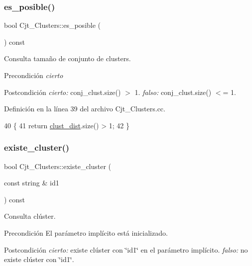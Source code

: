 \subsubsection{\texorpdfstring{es\+\_\+posible()}{es\_posible()}}
{\footnotesize\ttfamily bool Cjt\+\_\+\+Clusters\+::es\+\_\+posible (\begin{DoxyParamCaption}{ }\end{DoxyParamCaption}) const}



Consulta tamaño de conjunto de clusters. 

\begin{DoxyPrecond}{Precondición}
{\itshape cierto} 
\end{DoxyPrecond}
\begin{DoxyPostcond}{Postcondición}
{\itshape cierto\+:} conj\+\_\+clust.\+size() $>$ 1. {\itshape falso\+:} conj\+\_\+clust.\+size() $<$= 1. 
\end{DoxyPostcond}


Definición en la línea 39 del archivo Cjt\+\_\+\+Clusters.\+cc.


\begin{DoxyCode}
40 \{
41     \textcolor{keywordflow}{return} \hyperlink{class_cjt___clusters_a2e0931084578a4abb26d17bf289628d2}{clust\_dist}.size() > 1;
42 \}
\end{DoxyCode}
\mbox{\label{class_cjt___clusters_a989a4f3092a2bd47dc9a855107aa5086}} 
\subsubsection{\texorpdfstring{existe\+\_\+cluster()}{existe\_cluster()}}
{\footnotesize\ttfamily bool Cjt\+\_\+\+Clusters\+::existe\+\_\+cluster (\begin{DoxyParamCaption}\item[{const string \&}]{id1 }\end{DoxyParamCaption}) const}



Consulta clúster. 

\begin{DoxyPrecond}{Precondición}
El parámetro implícito está inicializado. 
\end{DoxyPrecond}
\begin{DoxyPostcond}{Postcondición}
{\itshape cierto\+:} existe clúster con \char`\"{}id1\char`\"{} en el parámetro implícito. {\itshape falso\+:} no existe clúster con \char`\"{}id1\char`\"{}. 
\end{DoxyPostcond}


